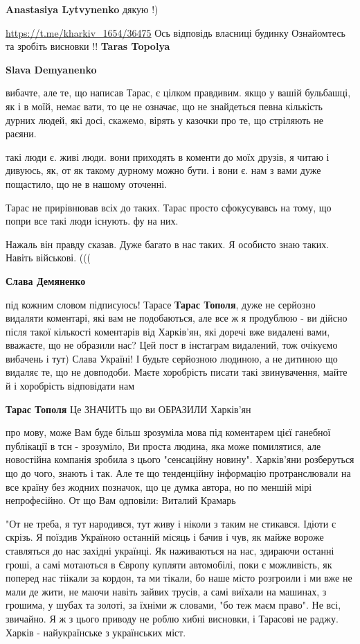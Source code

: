 \begin{itemize}
\begin{itemize}
\textbf{Anastasiya Lytvynenko} дякую !)

\url{https://t.me/kharkiv_1654/36475}
Ось відповідь власниці будинку
Ознайомтесь та зробіть висновки !!
\textbf{Taras Topolya}


\textbf{Slava Demyanenko} 

вибачте, але те, що написав Тарас, є цілком правдивим. якщо у вашій бульбашці,
як і в моїй, немає вати, то це не означає, що не знайдеться певна кількість
дурних людей, які досі, скажемо, вірять у казочки про те, що стріляють не
раєяни.

такі люди є. живі люди. вони приходять в коменти до моїх друзів, я читаю і
дивуюсь, як, от як такому дурному можно бути. і вони є.  нам з вами дуже
пощастило, що не в нашому оточенні.

Тарас не прирівнював всіх до таких. Тарас просто сфокусувавсь на тому, що попри
все такі люди існують. фу на них.

Нажаль він правду сказав. Дуже багато в нас таких. Я особисто знаю таких. Навіть військові. (((

\textbf{Слава Демяненко} 

під кожним словом підписуюсь! Тарасе \textbf{Тарас Тополя}, дуже не серйозно видаляти
коментарі, які вам не подобаються, але все ж я продублюю - ви дійсно після
такої кількості коментарів від Харків'ян, які доречі вже видалені вами,
вважаєте, що не образили нас? Цей пост в інстаграм видалений, тож очікуємо
вибачень і тут) Слава Україні! І будьте серйозною людиною, а не дитиною що
видаляє те, що не довподоби. Маєте хоробрість писати такі звинувачення, майте й
і хоробрість відповідати нам

\textbf{Тарас Тополя} Це ЗНАЧИТЬ що ви ОБРАЗИЛИ Харків'ян


про мову, може Вам буде більш зрозуміла мова під коментарем цієї ганебної
публікації в тсн - зрозуміло, Ви проста людина, яка може помилятися, але
новостійна компанія зробила з цього "сенсаційну новину". Харків'яни розберуться
що до чого, знають і так. Але те що тенденційну інформацію протранслювали на
все країну без жодних позначок, що це думка автора, но по меншій мірі
непрофесійно. От що Вам одповіли: Виталий Крамарь

"От не треба, я тут народився, тут живу і ніколи з таким не стикався. Ідіоти є
скрізь. Я поїздив Україною останній місяць і бачив і чув, як майже вороже
ставляться до нас західні українці. Як наживаються на нас, здираючи останні
гроші, а самі мотаються в Європу купляти автомобілі, поки є можливість, як
поперед нас тіікали за кордон, та ми тікали, бо наше місто розгроили і ми вже
не мали де жити, не маючи навіть зайвих трусів, а самі виїхали на машинах, з
грошима, у шубах та золоті, за їхніми ж словами, "бо теж маєм право". Не всі,
звичайно. Я ж з цього приводу не роблю хибні висновки, і Тарасові не раджу.
Харків - найукраїнське з українських міст.


\end{itemize}
\end{itemize}
